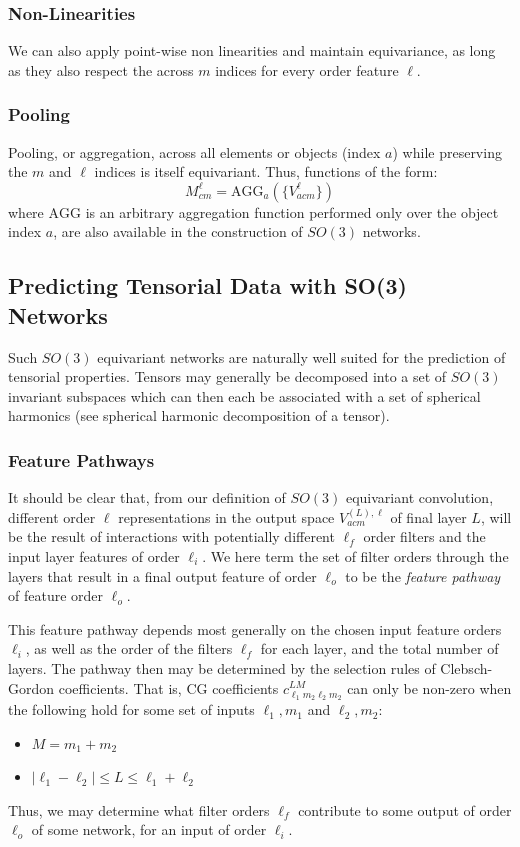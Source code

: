 \documentclass[10pt,a4paper]{article}
\begin{document}
\subsubsection{Non-Linearities}
We can also apply point-wise non linearities and maintain equivariance, as long as they also respect the across $m$ indices for every order feature $\ell$.

\subsubsection{Pooling}
Pooling, or aggregation, across all elements or objects (index $a$) while preserving the $m$ and $\ell$ indices is itself equivariant. Thus, functions of the form:
$$
 M_{cm}^{\ell} = \text{AGG}_{a}(\lbrace V_{acm}^{\ell}\rbrace)
$$ 
where $\text{AGG}$ is an arbitrary aggregation function performed only over the object index $a$, are also available in the construction of $SO(3)$ networks.

\subsection{Predicting Tensorial Data with SO(3) Networks}
Such $SO(3)$ equivariant networks are naturally well suited for the prediction of tensorial properties. Tensors may generally be decomposed into a set of $SO(3)$ invariant subspaces which can then each be associated with a set of spherical harmonics (see spherical harmonic decomposition of a tensor).

\subsubsection{Feature Pathways}
It should be clear that, from our definition of $SO(3)$ equivariant convolution, different order $\ell$ representations in the output space $V^{(L), \ell}_{acm}$ of final layer $L$, will be the result of interactions with potentially different $\ell_f$ order filters and the input layer features of order $\ell_i$. We here term the set of filter orders through the layers that result in a final output feature of order $\ell_o$ to be the \textit{feature pathway} of feature order $\ell_o$.

This feature pathway depends most generally on the chosen input feature orders $\ell_i$, as well as the order of the filters  $\ell_f$ for each layer, and the total number of layers. The pathway then may be determined by the selection rules of Clebsch-Gordon coefficients. That is, CG coefficients $c^{LM}_{\ell_1m_2\ell_2m_2}$ can only be non-zero when the following hold for some set of inputs $\ell_1,m_1$ and $\ell_2, m_2$:
\begin{itemize}
\item $M=m_1+m_2$
\item $|\ell_1-\ell_2|\leq L\leq \ell_1+\ell_2$
\end{itemize}
Thus, we may determine what filter orders $\ell_f$ contribute to some output of order $\ell_o$ of some network, for an input of order $\ell_i$.
\end{document}
